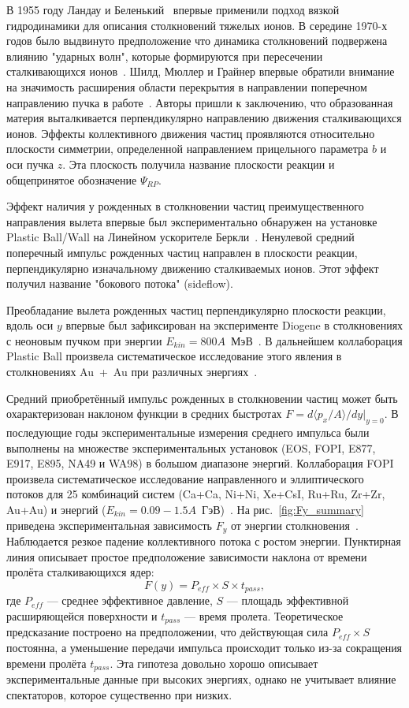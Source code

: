 В 1955 году Ландау и Беленький~\cite{Belenkij:1955pgn} впервые применили подход вязкой гидродинамики для описания столкновений тяжелых ионов. 
В середине 1970-х годов было выдвинуто предположение что динамика столкновений подвержена влиянию "ударных волн", которые формируются при пересечении сталкивающихся ионов~\cite{Chapline:1973kkq}.
Шилд, Мюллер и Грайнер впервые обратили внимание на значимость расширения области перекрытия в направлении поперечном направлению пучка в работе~\cite{Scheid:1974zz}.
Авторы пришли к заключению, что образованная материя выталкивается перпендикулярно направлению движения сталкивающихся ионов. 
Эффекты коллективного движения частиц проявляются относительно плоскости симметрии, определенной направлением прицельного параметра $b$ и оси пучка $z$.
Эта плоскость получила название плоскости реакции и общепринятое обозначение $\Psi_{RP}$.

Эффект наличия у рожденных в столкновении частиц преимущественного направления вылета впервые был экспериментально обнаружен на установке Plastic Ball/Wall на Линейном ускорителе Беркли~\cite{Gustafsson:1984ka}. 
Ненулевой средний поперечный импульс рожденных частиц направлен в плоскости реакции, перпендикулярно изначальному движению сталкиваемых ионов.
Этот эффект получил название "бокового потока" (sideflow).

Преобладание вылета рожденных частиц перпендикулярно плоскости реакции, вдоль оси $y$ впервые был зафиксирован на эксперименте Diogene в столкновениях с неоновым пучком при энергии $E_{kin}=800A$~МэВ~\cite{Demoulins:1990ac}.
В дальнейшем коллаборация Plastic Ball произвела систематическое исследование этого явления в столкновениях Au~+~Au при различных энергиях~\cite{Gustafsson:1984qh, Gutbrod:1988hh}.

Средний приобретённый импульс рожденных в столкновении частиц может быть охарактеризован наклоном функции в средних быстротах $F=d\langle p_x /A \rangle / dy|_{y=0}$.
В последующие годы экспериментальные измерения среднего импульса были выполнены на множестве экспериментальных установок (EOS, FOPI, E877, E917, E895, NA49 и WA98) в большом диапазоне энергий.
Коллаборация FOPI произвела систематическое исследование направленного и эллиптического потоков для 25 комбинаций систем (Ca+Ca, Ni+Ni, Xe+CsI, Ru+Ru, Zr+Zr, Au+Au) и энергий ($E_{kin}=0.09-1.5A$~ГэВ)~\cite{FOPI:2011aa}. 
На рис.~\ref{fig:Fy_summary} приведена экспериментальная зависимость $F_y$ от энергии столкновения~\cite{Herrmann:1999wu}.
Наблюдается резкое падение коллективного потока с ростом энергии.
Пунктирная линия описывает простое предположение зависимости наклона от времени пролёта сталкивающихся ядер:
%
\begin{equation}
    F(y) = P_{eff} \times S \times t_{pass},
\end{equation}
%
где $P_{eff}$ --- среднее эффективное давление, $S$ --- площадь эффективной расширяющейся поверхности и $t_{pass}$ --- время пролета.
Теоретическое предсказание построено на предположении, что действующая сила $P_{eff} \times S$ постоянна, а уменьшение передачи импульса происходит только из-за сокращения времени пролёта $t_{pass}$.
Эта гипотеза довольно хорошо описывает экспериментальные данные при высоких энергиях, однако не учитывает влияние спектаторов, которое существенно при низких.

